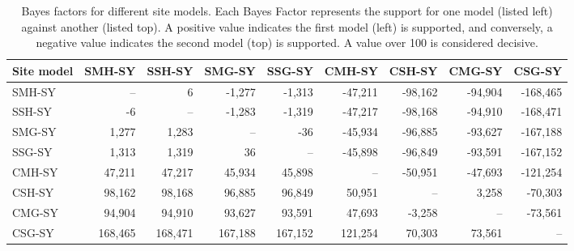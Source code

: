 \documentclass[]{article}
\begin{document}
\begin{table}

\caption{\label{tab:site-models-old}Bayes factors for different site models. Each Bayes Factor represents the support for one model (listed left) against another (listed top). A positive value indicates the first model (left) is supported, and conversely, a negative value indicates the second model (top) is supported. A value over 100 is considered decisive.}
\centering
\begin{tabular}[t]{lrrrrrrrr}
\toprule
Site model & SMH-SY & SSH-SY & SMG-SY & SSG-SY & CMH-SY & CSH-SY & CMG-SY & CSG-SY\\
\midrule
SMH-SY & -- & 6 & -1,277 & -1,313 & -47,211 & -98,162 & -94,904 & -168,465\\
SSH-SY & -6 & -- & -1,283 & -1,319 & -47,217 & -98,168 & -94,910 & -168,471\\
SMG-SY & 1,277 & 1,283 & -- & -36 & -45,934 & -96,885 & -93,627 & -167,188\\
SSG-SY & 1,313 & 1,319 & 36 & -- & -45,898 & -96,849 & -93,591 & -167,152\\
\addlinespace
CMH-SY & 47,211 & 47,217 & 45,934 & 45,898 & -- & -50,951 & -47,693 & -121,254\\
CSH-SY & 98,162 & 98,168 & 96,885 & 96,849 & 50,951 & -- & 3,258 & -70,303\\
CMG-SY & 94,904 & 94,910 & 93,627 & 93,591 & 47,693 & -3,258 & -- & -73,561\\
CSG-SY & 168,465 & 168,471 & 167,188 & 167,152 & 121,254 & 70,303 & 73,561 & --\\
\bottomrule
\end{tabular}
\end{table}
\end{document}

